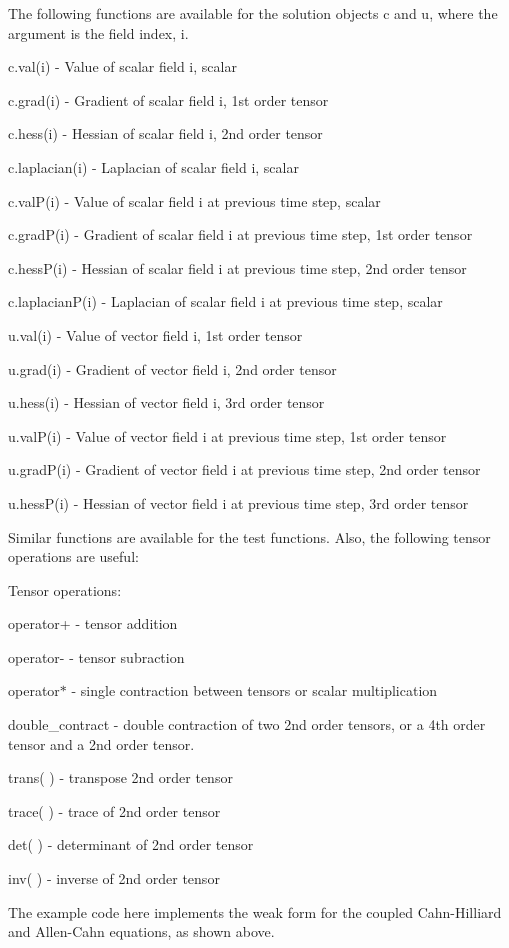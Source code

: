The following functions are available for the solution objects {\ttfamily c} and {\ttfamily u}, where the argument is the field index, i.

{\ttfamily c.\-val(i)} -\/ Value of scalar field i, scalar \par
{\ttfamily c.\-grad(i)} -\/ Gradient of scalar field i, 1st order tensor \par
{\ttfamily c.\-hess(i)} -\/ Hessian of scalar field i, 2nd order tensor \par
{\ttfamily c.\-laplacian(i)} -\/ Laplacian of scalar field i, scalar \par
{\ttfamily c.\-val\-P(i)} -\/ Value of scalar field i at previous time step, scalar \par
{\ttfamily c.\-grad\-P(i)} -\/ Gradient of scalar field i at previous time step, 1st order tensor \par
{\ttfamily c.\-hess\-P(i)} -\/ Hessian of scalar field i at previous time step, 2nd order tensor \par
{\ttfamily c.\-laplacian\-P(i)} -\/ Laplacian of scalar field i at previous time step, scalar

{\ttfamily u.\-val(i)} -\/ Value of vector field i, 1st order tensor \par
{\ttfamily u.\-grad(i)} -\/ Gradient of vector field i, 2nd order tensor \par
{\ttfamily u.\-hess(i)} -\/ Hessian of vector field i, 3rd order tensor \par
{\ttfamily u.\-val\-P(i)} -\/ Value of vector field i at previous time step, 1st order tensor \par
{\ttfamily u.\-grad\-P(i)} -\/ Gradient of vector field i at previous time step, 2nd order tensor \par
{\ttfamily u.\-hess\-P(i)} -\/ Hessian of vector field i at previous time step, 3rd order tensor

Similar functions are available for the test functions. Also, the following tensor operations are useful\-:

Tensor operations\-: \par
{\ttfamily operator+} -\/ tensor addition \par
{\ttfamily operator-\/} -\/ tensor subraction \par
{\ttfamily operator$\ast$} -\/ single contraction between tensors or scalar multiplication \par
{\ttfamily double\-\_\-contract} -\/ double contraction of two 2nd order tensors, or a 4th order tensor and a 2nd order tensor. \par
{\ttfamily trans( )} -\/ transpose 2nd order tensor \par
{\ttfamily trace( )} -\/ trace of 2nd order tensor \par
{\ttfamily det( )} -\/ determinant of 2nd order tensor \par
{\ttfamily inv( )} -\/ inverse of 2nd order tensor \par
 The example code here implements the weak form for the coupled Cahn-\/\-Hilliard and Allen-\/\-Cahn equations, as shown above.

